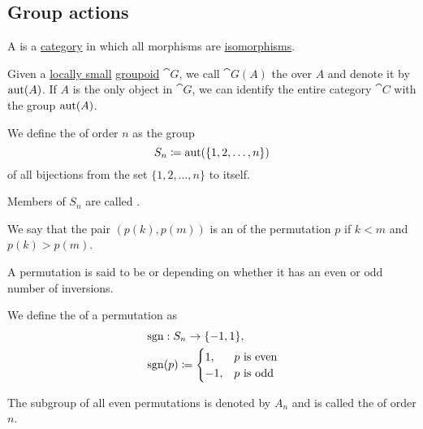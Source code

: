 \subsection{Group actions}\label{subsec:group_actions}

\begin{definition}\label{def:groupoid}
  A  is a \hyperref[def:category]{category} in which all morphisms are \hyperref[def:morphism_invertibility]{isomorphisms}.
\end{definition}

\begin{definition}\label{def:automorphism_group}
  Given a \hyperref[def:small_and_large_categories]{locally small} \hyperref[def:groupoid]{groupoid} \( \cat{G} \), we call \( \cat{G}(A) \) the  over \( A \) and denote it by \( \operatorname{aut}(A) \). If \( A \) is the only object in \( \cat{G} \), we can identify the entire category \( \cat{C} \) with the group \( \operatorname{aut}(A) \).
\end{definition}

\begin{definition}\label{def:symmetric_group}
  We define the  of order \( n \) as the group
  \begin{equation*}
    S_n \coloneqq \operatorname{aut}(\{ 1, 2, \ldots, n \})
  \end{equation*}
  of all bijections from the set \( \{ 1, 2, \ldots, n \} \) to itself.

  \begin{thmenum}
     Members of \( S_n \) are called .

     We say that the pair \( (p(k), p(m)) \) is an  of the permutation \( p \) if \( k < m \) and \( p(k) > p(m) \).

     A permutation is said to be  or  depending on whether it has an even or odd number of inversions.

     We define the  of a permutation as
    \begin{align*}
       &\operatorname{sgn}: S_n \to \{ -1, 1 \}, \\
       &\operatorname{sgn}(p) \coloneqq \begin{cases}
        1,  &p \text{ is even} \\
        -1, &p \text{ is odd}
      \end{cases}
    \end{align*}

     The subgroup of all even permutations is denoted by \( A_n \) and is called the  of order \( n \).
  \end{thmenum}
\end{definition}

